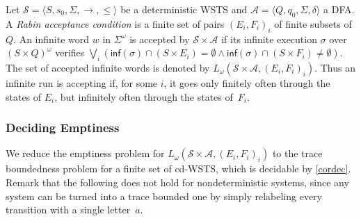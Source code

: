 \documentclass[11pt,reqno,a4paper]{amsart}
\newcommand{\tup}[1]{\langle #1\rangle}
\theoremstyle{plain}
\theoremstyle{definition}
\theoremstyle{remark}
\renewcommand{\paragraph}{\subsubsection*}
\begin{document}
Let $\mathcal{S}=\tup{S,s_0,\Sigma,\rightarrow,\leq}$ be a
deterministic WSTS and $\mathcal{A}=\tup{Q,q_0,\Sigma,\delta}$ a DFA.
A \emph{Rabin acceptance condition} is a finite
set of pairs $(E_i,F_i)_i$ of finite subsets of $Q$.  An infinite word $w$
in $\Sigma^\omega$ is accepted by $\mathcal{S}\times\mathcal{A}$ if
its infinite execution $\sigma$ over $(S\times Q)^\omega$ verifies
$\bigvee_i(\mathsf{inf}(\sigma)\cap(S\times
  E_i)=\emptyset\wedge\mathsf{inf}(\sigma)\cap(S\times
  F_i)\neq\emptyset)$.  The set of accepted infinite words is denoted by
$L_\omega(\mathcal{S}\times\mathcal{A},(E_i,F_i)_i)$.  Thus
an infinite run is accepting if, for some $i$, it goes only finitely
often through the states of $E_i$, but infinitely often through the
states of~$F_i$.

\paragraph{Deciding Emptiness}We reduce the emptiness problem for
$L_\omega(\mathcal{S}\times\mathcal{A},(E_i,F_i)_i)$ to the
trace boundedness problem for a finite set of cd-WSTS,
which is decidable by \autoref{cordec}.
Remark that the following does not hold for nondeterministic
systems, since any system can be turned into a trace bounded
one by simply relabeling every transition with a single
letter~$a$.
\end{document}
